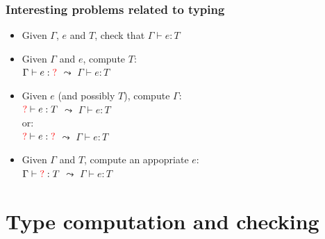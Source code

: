 \documentclass{beamer}
\begin{document}
\begin{frame}[fragile]\frametitle{Interesting problems related to typing}

  \begin{itemize}
  \item {} Given $\Gamma$, $e$ and $T$, check that $\Gamma \vdash e : T$

  \item {} Given $\Gamma$ and $e$, compute $T$:\\
    $\Gamma \vdash e : {\color{red}?}$ \hspace{4mm} $\leadsto$ \hspace{4mm} $\Gamma \vdash e : T$

    
  \item {} Given $e$ (and possibly $T$), compute $\Gamma$:\\
    ${\color{red}?} \vdash e : T$ \hspace{4mm} $\leadsto$ \hspace{4mm} $\Gamma \vdash e : T$\\
    or:\\
    ${\color{red}?} \vdash e : {\color{red}?}$ \hspace{4mm} $\leadsto$ \hspace{4mm} $\Gamma \vdash e : T$

  \item {} Given $\Gamma$ and $T$, compute an appopriate $e$:\\
    $\Gamma \vdash {\color{red}?} : T$ \hspace{4mm} $\leadsto$ \hspace{4mm} $\Gamma \vdash e : T$
  \end{itemize}

\end{frame}


\section{Type computation and checking}
\end{document}
